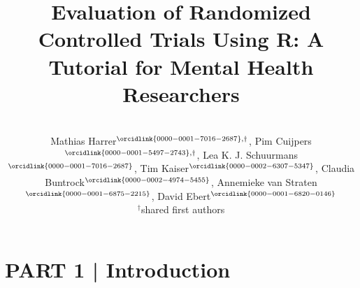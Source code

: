 \title{\textcolor{sBlue}{Evaluation of Randomized Controlled Trials Using
R: A Tutorial for Mental Health Researchers}}

\author{\\ 
    Mathias Harrer$^{\orcidlink{0000-0001-7016-2687},\dag}$, 
    Pim Cuijpers$^{\orcidlink{0000-0001-5497-2743},\dag}$, 
    Lea K. J. Schuurmans$^{\orcidlink{0000-0001-7016-2687}}$, 
    Tim Kaiser$^{\orcidlink{0000-0002-6307-5347}}$, 
    Claudia Buntrock$^{\orcidlink{0000-0002-4974-5455}}$, 
    Annemieke van Straten$^{\orcidlink{0000-0001-6875-2215}}$, 
    David Ebert$^{\orcidlink{0000-0001-6820-0146}}$
    \begin{flushright}
        \vspace{-9mm}
        {\normalfont\scriptsize $^{\dag}$shared first authors}
    \end{flushright}
} 
\maketitle




\vspace{-2mm}

\section{{\textsf{\textcolor{sBlue}{\small PART 1 |}}} Introduction}



